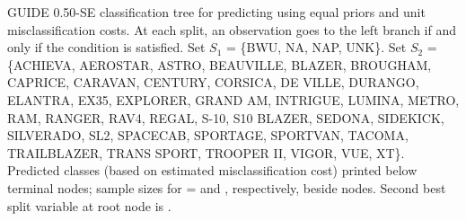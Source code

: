 \documentclass[12pt]{article}
\begin{document}
 \begin{center}
 \end{center}
GUIDE  0.50-SE classification tree for predicting \texttt{} using
 equal priors
 and unit misclassification costs.
At each split, an observation goes to the left branch 
 if and only if the condition is satisfied.
Set $S_{1}$ = \{BWU, NA, NAP, UNK\}.
Set $S_{2}$ = \{ACHIEVA, AEROSTAR, ASTRO, BEAUVILLE, BLAZER, BROUGHAM, CAPRICE,
 CARAVAN, CENTURY, CORSICA, DE VILLE, DURANGO, ELANTRA, EX35, EXPLORER,
 GRAND AM, INTRIGUE, LUMINA, METRO, RAM, RANGER, RAV4, REGAL, S-10, S10 BLAZER,
 SEDONA, SIDEKICK, SILVERADO, SL2, SPACECAB, SPORTAGE, SPORTVAN, TACOMA,
 TRAILBLAZER, TRANS SPORT, TROOPER II, VIGOR, VUE, XT\}.
Predicted classes (based on estimated misclassification cost)
printed below terminal nodes;
 sample sizes for \texttt{} =
 \texttt{} and \texttt{}, respectively, beside nodes.
Second best split variable at root node is \texttt{}.
 
\end{document}
